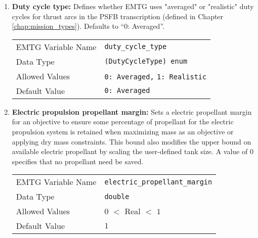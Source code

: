 \begin{enumerate}
    \item \textbf{Duty cycle type:} Defines whether \ac{EMTG} uses "averaged" or "realistic" duty cycles for thrust arcs in the \ac{PSFB} transcription (defined in Chapter \ref{chap:mission_types}). Defaults to ``0: Averaged''.
    \begin{table}[H]
        \hspace{2cm}
        \begin{tabular}{lp{5cm}}
        \ac{EMTG} Variable Name & \verb|duty_cycle_type| \\
        Data Type & \verb|(DutyCycleType) enum| \\
        Allowed Values & \verb|0: Averaged,| \newline
                        \verb|1: Realistic| \\
        Default Value & \verb|0: Averaged| \\
        \end{tabular}
    \end{table}
    
    \item \textbf{Electric propulsion propellant margin:} Sets a electric propellant margin for an objective to ensure some percentage of propellant for the electric propulsion system is retained when maximizing mass as an objective or applying dry mass constraints. This bound also modifies the upper bound on available electric propellant by scaling the user-defined tank size. A value of 0 specifies that no propellant need be saved.
    \begin{table}[H]
        \hspace{2cm}
        \begin{tabular}{lp{5cm}}
        \ac{EMTG} Variable Name & \verb|electric_propellant_margin| \\
        Data Type & \verb|double| \\
        Allowed Values & $0$ $<$ Real $<$ $1$ \\
        Default Value & $1$ \\
        \end{tabular}
    \end{table}
    

\end{enumerate}
